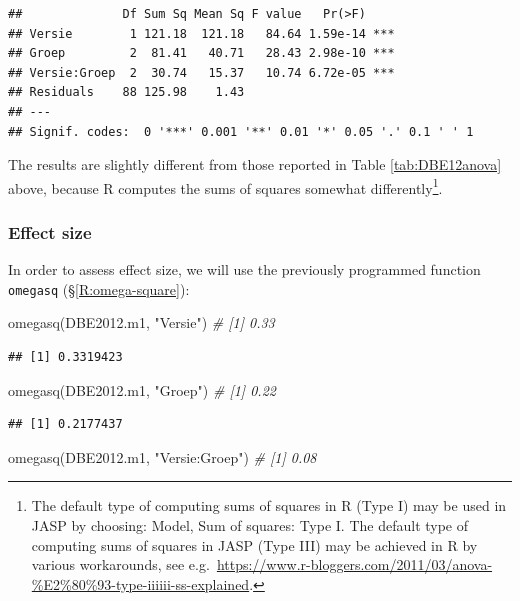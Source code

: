 \documentclass[
]{book}
\newenvironment{Shaded}{\begin{snugshade}}{\end{snugshade}}
\newcommand{\CommentTok}[1]{\textcolor[rgb]{0.56,0.35,0.01}{\textit{#1}}}
\newcommand{\FunctionTok}[1]{\textcolor[rgb]{0.00,0.00,0.00}{#1}}
\newcommand{\NormalTok}[1]{#1}
\newcommand{\StringTok}[1]{\textcolor[rgb]{0.31,0.60,0.02}{#1}}
\begin{document}
\begin{verbatim}
##              Df Sum Sq Mean Sq F value   Pr(>F)    
## Versie        1 121.18  121.18   84.64 1.59e-14 ***
## Groep         2  81.41   40.71   28.43 2.98e-10 ***
## Versie:Groep  2  30.74   15.37   10.74 6.72e-05 ***
## Residuals    88 125.98    1.43                     
## ---
## Signif. codes:  0 '***' 0.001 '**' 0.01 '*' 0.05 '.' 0.1 ' ' 1
\end{verbatim}

The results are slightly different from those reported in Table \ref{tab:DBE12anova} above, because R computes the sums of squares somewhat differently\footnote{The default type of computing sums of squares in R (Type I) may be used in JASP by choosing: Model, Sum of squares: Type I. The default type of computing sums of squares in JASP (Type III) may be achieved in R by various workarounds, see e.g.~\url{https://www.r-bloggers.com/2011/03/anova-\%E2\%80\%93-type-iiiiii-ss-explained}.}.

\hypertarget{effectsize}{%
\subsubsection{Effect size}\label{effectsize}}

In order to assess effect size, we will use the previously programmed function \texttt{omegasq}
(§\ref{R:omega-square}):

\begin{Shaded}
\begin{Highlighting}[]
\FunctionTok{omegasq}\NormalTok{(DBE2012.m1, }\StringTok{"Versie"}\NormalTok{)        }\CommentTok{\# [1] 0.33}
\end{Highlighting}
\end{Shaded}

\begin{verbatim}
## [1] 0.3319423
\end{verbatim}

\begin{Shaded}
\begin{Highlighting}[]
\FunctionTok{omegasq}\NormalTok{(DBE2012.m1, }\StringTok{"Groep"}\NormalTok{)         }\CommentTok{\# [1] 0.22}
\end{Highlighting}
\end{Shaded}

\begin{verbatim}
## [1] 0.2177437
\end{verbatim}

\begin{Shaded}
\begin{Highlighting}[]
\FunctionTok{omegasq}\NormalTok{(DBE2012.m1, }\StringTok{"Versie:Groep"}\NormalTok{)  }\CommentTok{\# [1] 0.08}
\end{Highlighting}
\end{Shaded}
\end{document}
